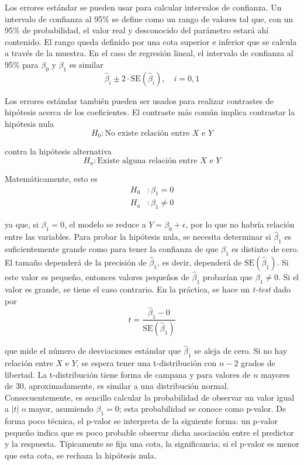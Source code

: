 Los errores estándar se pueden usar para calcular intervalos de confianza. Un intervalo de confianza al 95\% se define como un rango de valores tal que, con un 95\% de probabilidad, el valor real y desconocido del parámetro estará ahí contenido. El rango queda definido por una cota superior e inferior que se calcula a través de la muestra. En el caso de regresión lineal, el intervalo de confianza al 95\% para $\beta_0$ y $\beta_1$ es similar
\begin{equation}
\hat{\beta}_i \pm 2 \cdot \text{SE}(\hat{\beta}_i), \quad i = 0, 1
\end{equation}

Los errores estándar también pueden ser usados para realizar contrastes de hipótesis acerca de los coeficientes. El contraste más común implica contrastar la hipótesis nula 
\begin{equation}
H_0 : \text{No existe relación entre } X \text{ e } Y
\end{equation}

\noindent contra la hipótesis alternativa 
\begin{equation}
H_a : \text{Existe alguna relación entre } X \text{ e } Y
\end{equation}

\noindent Matemáticamente, esto es 
\begin{align}
H_0 &: \beta_1 = 0 \\
H_a &: \beta_1 \neq 0
\end{align}

\noindent ya que, si $\beta_1 = 0$, el modelo se reduce a $Y = \beta_0 + \epsilon$, por lo que no habría relación entre las variables. Para probar la hipótesis nula, se necesita determinar si $\hat{\beta}_1$ es suficientemente grande como para tener la confianza de que $\beta_1$ es distinto de cero. El tamaño dependerá de la precisión de $\hat{\beta}_1$, es decir, dependerá de $\text{SE}(\hat{\beta}_1)$. Si este valor es pequeño, entonces valores pequeños de $\hat{\beta}_1$ probarían que $\beta_1 \neq 0$. Si el valor es grande, se tiene el caso contrario. En la práctica, se hace un \textit{t-test} dado por 
\begin{equation}
t = \frac{\hat{\beta}_1 - 0}{\text{SE}(\hat{\beta}_1)}
\end{equation}

\noindent que mide el número de desviaciones estándar que $\hat{\beta}_1$ se aleja de cero. Si no hay relación entre $X$ e $Y$, se espera tener una t-distribución con $n-2$ grados de libertad. La t-distribución tiene forma de campana y para valores de $n$ mayores de 30, aproximadamente, es similar a una distribución normal. Consecuentemente, es sencillo calcular la probabilidad de observar un valor igual a $|t|$ o mayor, asumiendo $\beta_1 = 0$; esta probabilidad se conoce como p-valor. De forma poco técnica, el p-valor se interpreta de la siguiente forma: un p-valor pequeño indica que es poco probable observar dicha asociación entre el predictor y la respuesta. Típicamente se fija una cota, la significancia; si el p-valor es menor que esta cota, se rechaza la hipótesis nula. 

